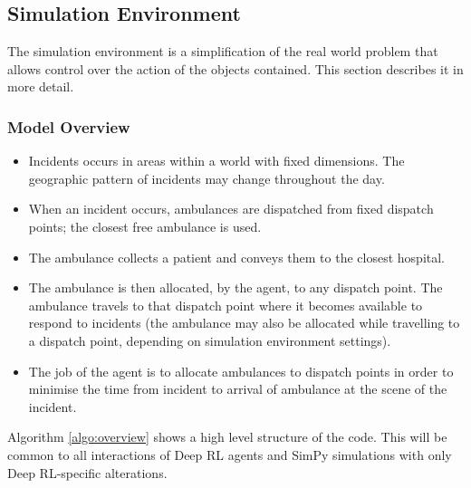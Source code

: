\documentclass{article}
\begin{document}
\subsection{Simulation Environment}

The simulation environment is a simplification of the real world problem that allows control over the action of the objects contained. This section describes it in more detail.

\subsubsection{Model Overview}

\begin{itemize}
    
    \item Incidents occurs in areas within a world with fixed dimensions. The geographic pattern of incidents may change throughout the day.

    \item When an incident occurs, ambulances are dispatched from fixed dispatch points; the closest free ambulance is used.

    \item The ambulance collects a patient and conveys them to the closest hospital.

    \item The ambulance is then allocated, by the agent, to any dispatch point. The ambulance travels to that dispatch point where it becomes available to respond to incidents (the ambulance may also be allocated while travelling to a dispatch point, depending on simulation environment settings).

    \item The job of the agent is to allocate ambulances to dispatch points in order to minimise the time from incident to arrival of ambulance at the scene of the incident.

\end{itemize}

Algorithm \ref{algo:overview} shows a high level structure of the code. This will be common to all interactions of Deep RL agents and SimPy simulations with only Deep RL-specific alterations.
\end{document}
